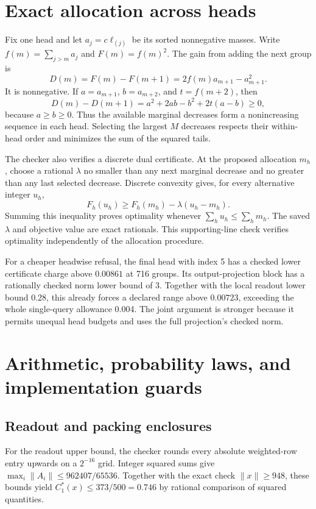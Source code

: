 \documentclass[10pt]{article}
\theoremstyle{definition}\newtheorem{definition}[theorem]{Definition}
\begin{document}
\section{Exact allocation across heads}
\label{app:allocation}
Fix one head and let $a_j=c\ell_{(j)}$ be its sorted nonnegative masses. Write $f(m)=\sum_{j>m}a_j$ and $F(m)=f(m)^2$. The gain from adding the next group is
\[
 D(m)=F(m)-F(m+1)=2f(m)a_{m+1}-a_{m+1}^2.
\]
It is nonnegative. If $a=a_{m+1}$, $b=a_{m+2}$, and $t=f(m+2)$, then
\[
 D(m)-D(m+1)=a^2+2ab-b^2+2t(a-b)\geq0,
\]
because $a\geq b\geq0$. Thus the available marginal decreases form a nonincreasing sequence in each head. Selecting the largest $M$ decreases respects their within-head order and minimizes the sum of the squared tails.

The checker also verifies a discrete dual certificate. At the proposed allocation $m_h$, choose a rational $\lambda$ no smaller than any next marginal decrease and no greater than any last selected decrease. Discrete convexity gives, for every alternative integer $u_h$,
\[
 F_h(u_h)\geq F_h(m_h)-\lambda(u_h-m_h).
\]
Summing this inequality proves optimality whenever $\sum_hu_h\leq\sum_hm_h$. The saved $\lambda$ and objective value are exact rationals. This supporting-line check verifies optimality independently of the allocation procedure.

For a cheaper headwise refusal, the final head with index 5 has a checked lower certificate charge above $0.00861$ at 716 groups. Its output-projection block has a rationally checked norm lower bound of 3. Together with the local readout lower bound 0.28, this already forces a declared range above $0.00723$, exceeding the whole single-query allowance 0.004. The joint argument is stronger because it permits unequal head budgets and uses the full projection's checked norm.

\section{Arithmetic, probability laws, and implementation guards}
\label{app:arithmetic}
\subsection{Readout and packing enclosures}
For the readout upper bound, the checker rounds every absolute weighted-row entry upwards on a $2^{-16}$ grid. Integer squared sums give $\max_i\|A_i\|\leq962407/65536$. Together with the exact check $\|x\|\geq948$, these bounds yield $C_1^*(x)\leq373/500=0.746$ by rational comparison of squared quantities.
\end{document}
